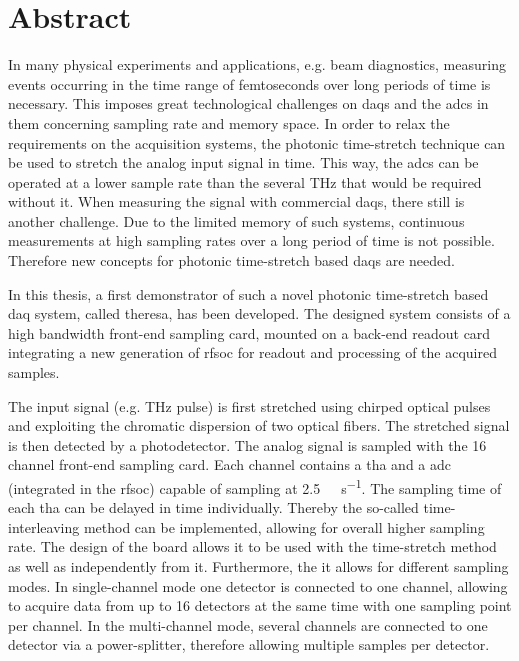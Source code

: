 \chapter*{Abstract}
In many physical experiments and applications, e.g. beam diagnostics, measuring events occurring in the time range of femtoseconds over long periods of time is necessary. 
This imposes great technological challenges on \glspl{daq} and the \glspl{adc} in them concerning sampling rate and memory space.
In order to relax the requirements on the acquisition systems, the photonic time-stretch technique can be used to stretch the analog input signal in time.
This way, the \glspl{adc} can be operated at a lower sample rate than the several \si{\THz} that would be required without it. 
When measuring the signal with commercial \glspl{daq}, there still is another challenge.
Due to the limited memory of such systems, continuous measurements at high sampling rates over a long period of time is not possible.
Therefore new concepts for photonic time-stretch based \glspl{daq} are needed.

In this thesis, a first demonstrator of such a novel photonic time-stretch based \gls{daq} system, called \gls{theresa}, has been developed.
The designed system consists of a high bandwidth front-end sampling card, mounted on a back-end readout card integrating a new generation of \gls{rfsoc} for readout and processing of the acquired samples.

The input signal (e.g. \si{\tera \hertz} pulse) is first stretched using chirped optical pulses and exploiting the chromatic dispersion of two optical fibers.
The stretched signal is then detected by a photodetector.
The analog signal is sampled with the 16 channel front-end sampling card.
Each channel contains a \gls{tha} and a \gls{adc} (integrated in the \gls{rfsoc}) capable of sampling at \SI{2.5}{\giga \sample \per \second}.
The sampling time of each \gls{tha} can be delayed in time individually. 
Thereby the so-called time-interleaving method can be implemented, allowing for overall higher sampling rate.
The design of the board allows it to be used with the time-stretch method as well as independently from it.
Furthermore, the it allows for different sampling modes.
In single-channel mode one detector is connected to one channel, allowing to acquire data from up to 16 detectors at the same time with one sampling point per channel.
In the multi-channel mode, several channels are connected to one detector via a power-splitter, therefore allowing multiple samples per detector.

